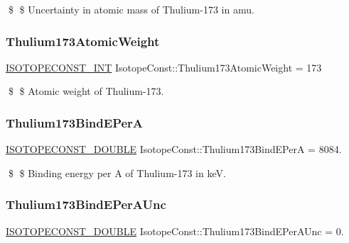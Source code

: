 \$ \$ Uncertainty in atomic mass of Thulium-\/173 in amu. \mbox{\label{group___isotope_const-_thulium-_tm173_ga4da13be2ccf48c1957ec394f1b19045e}} 
\subsubsection{\texorpdfstring{Thulium173\+Atomic\+Weight}{Thulium173AtomicWeight}}
{\footnotesize\ttfamily \mbox{\hyperlink{group___isotope_const-_macros_ga5f18360b3e99483a35c32d789e62621c}{I\+S\+O\+T\+O\+P\+E\+C\+O\+N\+S\+T\+\_\+\+I\+NT}} Isotope\+Const\+::\+Thulium173\+Atomic\+Weight = 173}

\$ \$ Atomic weight of Thulium-\/173. \mbox{\label{group___isotope_const-_thulium-_tm173_gade1db67822764b8d4791d3ba14ef9d38}} 
\subsubsection{\texorpdfstring{Thulium173\+Bind\+E\+PerA}{Thulium173BindEPerA}}
{\footnotesize\ttfamily \mbox{\hyperlink{group___isotope_const-_macros_ga8f45a7272ce02c0b4c65c44636ed719a}{I\+S\+O\+T\+O\+P\+E\+C\+O\+N\+S\+T\+\_\+\+D\+O\+U\+B\+LE}} Isotope\+Const\+::\+Thulium173\+Bind\+E\+PerA = 8084.}

\$ \$ Binding energy per A of Thulium-\/173 in keV. \mbox{\label{group___isotope_const-_thulium-_tm173_ga1c16d559df0ca8f7edbf860891de06ea}} 
\subsubsection{\texorpdfstring{Thulium173\+Bind\+E\+Per\+A\+Unc}{Thulium173BindEPerAUnc}}
{\footnotesize\ttfamily \mbox{\hyperlink{group___isotope_const-_macros_ga8f45a7272ce02c0b4c65c44636ed719a}{I\+S\+O\+T\+O\+P\+E\+C\+O\+N\+S\+T\+\_\+\+D\+O\+U\+B\+LE}} Isotope\+Const\+::\+Thulium173\+Bind\+E\+Per\+A\+Unc = 0.}

